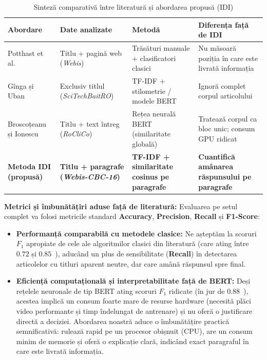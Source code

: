 \documentclass[12pt, a4paper]{article}
\begin{document}
\begin{table}[htbp]
\centering
\caption{Sinteză comparativă între literatură și abordarea propusă (IDI)}
\label{tab:comparatie_literatura}
\renewcommand{\arraystretch}{1.35}
\begin{tabular}{p{3.2cm} p{3.0cm} p{3.2cm} p{4.0cm}}
\toprule
\textbf{Abordare} & \textbf{Date analizate} & \textbf{Metodă} & \textbf{Diferența față de IDI} \\
\midrule
Potthast et al.~\cite{potthast2016} & Titlu + pagină web (\textit{Webis}) & Trăsături manuale + clasificatori clasici & Nu măsoară poziția în care este livrată informația \\
Gînga și Uban~\cite{ginga2024} & Exclusiv titlul (\textit{SciTechBaitRO}) & TF-IDF + stilometrie / modele BERT & Ignoră complet corpul articolului \\
Broscoțeanu și Ionescu~\cite{broscoteanu2023} & Titlu + text întreg (\textit{RoCliCo}) & Rețea neurală BERT (similaritate globală) & Tratează corpul ca bloc unic; consum GPU ridicat \\
\midrule
\textbf{Metoda IDI (propusă)} & \textbf{Titlu + paragrafe (\textit{Webis-CBC-16})} & \textbf{TF-IDF + similaritate cosinus pe paragrafe} & \textbf{Cuantifică amânarea răspunsului pe paragrafe} \\
\bottomrule
\end{tabular}
\end{table}

\textbf{Metrici și îmbunătățiri aduse față de literatură:}
Evaluarea pe setul complet va folosi metricile standard \textbf{Accuracy}, \textbf{Precision}, \textbf{Recall} și \textbf{F1-Score}:
\begin{itemize}
    \item \textbf{Performanță comparabilă cu metodele clasice:} Ne așteptăm la scoruri $F_1$ apropiate de cele ale algoritmilor clasici din literatură (care ating între $0.72$ și $0.85$~\cite{broscoteanu2023, ginga2024}), aducând un plus de sensibilitate (\textbf{Recall}) în detectarea articolelor cu titluri aparent neutre, dar care amână răspunsul spre final.
    \item \textbf{Eficiență computațională și interpretabilitate față de BERT:} Deși rețelele neuronale de tip BERT ating scoruri $F_1$ ridicate (în jur de $0.88$~\cite{broscoteanu2023, ginga2024}), acestea implică un consum foarte mare de resurse hardware (necesită plăci video performante și timp îndelungat de antrenare) și nu oferă o justificare directă a deciziei. Abordarea noastră aduce o îmbunătățire practică semnificativă: rulează rapid pe un procesor obișnuit (CPU), are un consum minim de memorie și oferă o explicație clară, indicând exact paragraful în care este livrată informația.
\end{itemize}
\end{document}
